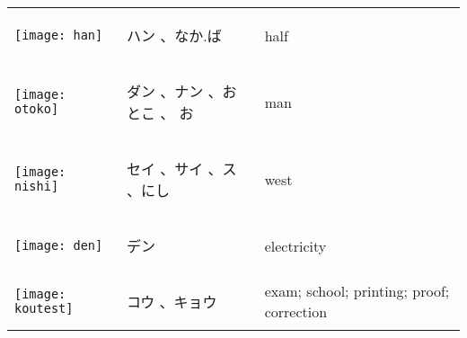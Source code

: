 \documentclass[a4paper,12pt]{extarticle}
\begin{document}
\begin{longtable}{|lp{6cm}p{4cm}|}
\begin{minipage}{0.3\textwidth}
\centerline{
	\texttt{[image: han]}
}
\end{minipage}
&
\begin{CJK}{UTF8}{min}ハン 、なか.ば\end{CJK}
&
 half
\\ 
\begin{minipage}{0.3\textwidth}
\centerline{
	\texttt{[image: otoko]}
}
\end{minipage}
&
\begin{CJK}{UTF8}{min}ダン 、ナン 、おとこ 、 お\end{CJK}
&
 man
\\ 
\begin{minipage}{0.3\textwidth}
\centerline{
	\texttt{[image: nishi]}
}
\end{minipage}
&
\begin{CJK}{UTF8}{min} セイ 、サイ 、ス 、にし\end{CJK}
&
 west
\\ 
\begin{minipage}{0.3\textwidth}
\centerline{
	\texttt{[image: den]}
}
\end{minipage}
&
\begin{CJK}{UTF8}{min}デン\end{CJK}
&
 electricity
\\ 
\begin{minipage}{0.3\textwidth}
\centerline{
	\texttt{[image: koutest]}
}
\end{minipage}
&
\begin{CJK}{UTF8}{min} コウ 、キョウ\end{CJK}
&
exam; school; printing; proof; correction
\\ 

\end{longtable}
\end{document}
